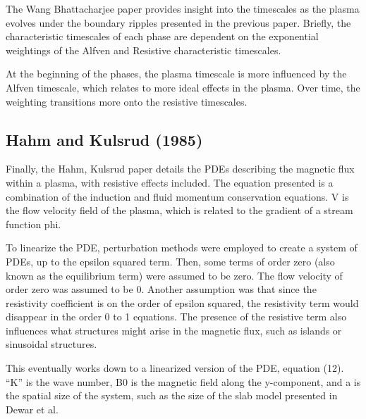 \documentclass[../main.tex]{subfiles}
\begin{document}
The Wang Bhattacharjee paper provides insight into the timescales as the plasma evolves under the boundary ripples presented in the previous paper. Briefly, the characteristic timescales of each phase are dependent on the exponential weightings of the Alfven and Resistive characteristic timescales. 

At the beginning of the phases, the plasma timescale is more influenced by the Alfven timescale, which relates to more ideal effects in the plasma. Over time, the weighting transitions more onto the resistive timescales.


\subsection{Hahm and Kulsrud (1985)}

Finally, the Hahm, Kulsrud paper details the PDEs describing the magnetic flux within a plasma, with resistive effects included. The equation presented is a combination of the induction and fluid momentum conservation equations. V is the flow velocity field of the plasma, which is related to the gradient of a stream function phi.

To linearize the PDE, perturbation methods were employed to create a system of PDEs, up to the epsilon squared term. Then, some terms of order zero (also known as the equilibrium term) were assumed to be zero. The flow velocity of order zero was assumed to be 0. Another assumption was that since the resistivity coefficient is on the order of epsilon squared, the resistivity term would disappear in the order 0 to 1 equations. The presence of the resistive term also influences what structures might arise in the magnetic flux, such as islands or sinusoidal structures.

This eventually works down to a linearized version of the PDE, equation (12). “K” is the wave number, B0 is the magnetic field along the y-component, and a is the spatial size of the system, such as the size of the slab model presented in Dewar et al.

    
\end{document}
